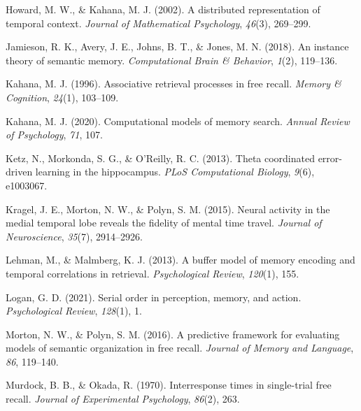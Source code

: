 \documentclass[
  letterpaper,
  DIV=11,
  numbers=noendperiod]{scrreport}
\newlength{\cslhangindent}
\newlength{\cslentryspacingunit} %
\newenvironment{CSLReferences}[2] %
 {%
  \setlength{\parindent}{0pt}
  \ifodd #1
  \let\oldpar\par
  \def\par{\hangindent=\cslhangindent\oldpar}
  \fi
  \setlength{\parskip}{#2\cslentryspacingunit}
 }%
 {}
\begin{document}
\begin{CSLReferences}{1}{0}
\leavevmode{}%
Howard, M. W., \& Kahana, M. J. (2002). A distributed representation of
temporal context. \emph{Journal of Mathematical Psychology},
\emph{46}(3), 269--299.

\leavevmode{}%
Jamieson, R. K., Avery, J. E., Johns, B. T., \& Jones, M. N. (2018). An
instance theory of semantic memory. \emph{Computational Brain \&
Behavior}, \emph{1}(2), 119--136.

\leavevmode{}%
Kahana, M. J. (1996). Associative retrieval processes in free recall.
\emph{Memory \& Cognition}, \emph{24}(1), 103--109.

\leavevmode{}%
Kahana, M. J. (2020). Computational models of memory search.
\emph{Annual Review of Psychology}, \emph{71}, 107.

\leavevmode{}%
Ketz, N., Morkonda, S. G., \& O'Reilly, R. C. (2013). Theta coordinated
error-driven learning in the hippocampus. \emph{PLoS Computational
Biology}, \emph{9}(6), e1003067.

\leavevmode{}%
Kragel, J. E., Morton, N. W., \& Polyn, S. M. (2015). Neural activity in
the medial temporal lobe reveals the fidelity of mental time travel.
\emph{Journal of Neuroscience}, \emph{35}(7), 2914--2926.

\leavevmode{}%
Lehman, M., \& Malmberg, K. J. (2013). A buffer model of memory encoding
and temporal correlations in retrieval. \emph{Psychological Review},
\emph{120}(1), 155.

\leavevmode{}%
Logan, G. D. (2021). Serial order in perception, memory, and action.
\emph{Psychological Review}, \emph{128}(1), 1.

\leavevmode{}%
Morton, N. W., \& Polyn, S. M. (2016). A predictive framework for
evaluating models of semantic organization in free recall. \emph{Journal
of Memory and Language}, \emph{86}, 119--140.

\leavevmode{}%
Murdock, B. B., \& Okada, R. (1970). Interresponse times in single-trial
free recall. \emph{Journal of Experimental Psychology}, \emph{86}(2),
263.


\end{CSLReferences}
\end{document}
